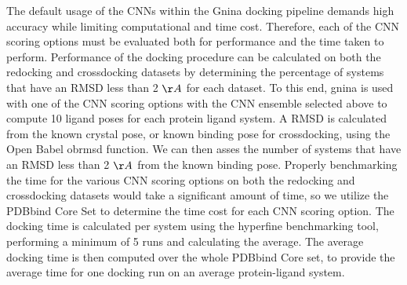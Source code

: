 \documentclass[journal=jcisd8,manuscript=article]{achemso}
\begin{document}
The default usage of the CNNs within the Gnina docking pipeline demands high accuracy while limiting computational and time cost. Therefore, each of the CNN scoring options must be evaluated both for performance and the time taken to perform. Performance of the docking procedure can be calculated on both the redocking and crossdocking datasets by determining the percentage of systems that have an RMSD less than 2 $\AA$ for each dataset. To this end, gnina is used with one of the CNN scoring options with the CNN ensemble selected above to compute 10 ligand poses for each protein ligand system. A RMSD is calculated from the known crystal pose, or known binding pose for crossdocking, using the Open Babel obrmsd function. We can then asses the number of systems that have an RMSD less than 2 $\AA$ from the known binding pose. Properly benchmarking the time for the various CNN scoring options on both the redocking and crossdocking datasets would take a significant amount of time, so we utilize the PDBbind Core Set to determine the time cost for each CNN scoring option. The docking time is calculated per system using the hyperfine benchmarking tool\cite{hyperfine}, performing a minimum of 5 runs and calculating the average. The average docking time is then computed over the whole PDBbind Core set, to provide the average time for one docking run on an average protein-ligand system.
\end{document}
